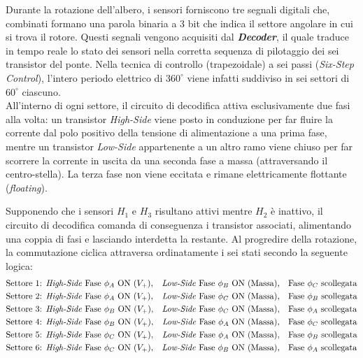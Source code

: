 ﻿\documentclass[11pt, a4paper]{article}
\begin{document}
Durante la rotazione dell'albero, i sensori forniscono tre segnali digitali che, combinati formano una parola binaria a 3 bit che indica il settore angolare in cui si trova il rotore. Questi segnali vengono acquisiti dal \textbf{\textit{Decoder}}, il quale traduce in tempo reale lo stato dei sensori nella corretta sequenza di pilotaggio dei sei transistor del ponte. Nella tecnica di controllo (trapezoidale) a sei passi (\textit{Six-Step Control}), l'intero periodo elettrico di $360^\circ$ viene infatti suddiviso in sei settori di $60^\circ$ ciascuno. \\
All'interno di ogni settore, il circuito di decodifica attiva esclusivamente due fasi alla volta: un transistor \textit{High-Side} viene posto in conduzione per far fluire la corrente dal polo positivo della tensione di alimentazione a una prima fase, mentre un transistor \textit{Low-Side} appartenente a un altro ramo viene chiuso per far scorrere la corrente in uscita da una seconda fase a massa (attraversando il centro-stella). La terza fase non viene eccitata e rimane elettricamente flottante (\textit{floating}).

Supponendo che i sensori $H_1$ e $H_3$ risultano attivi mentre $H_2$ è inattivo, il circuito di decodifica comanda di conseguenza i transistor associati, alimentando una coppia di fasi e lasciando interdetta la restante. Al progredire della rotazione, la commutazione ciclica attraversa ordinatamente i sei stati secondo la seguente logica:
\begin{align*}
    \text{Settore 1: } & \text{\textit{High-Side} Fase } \phi_A \text{ ON } (V_+), & \text{\textit{Low-Side} Fase } \phi_B \text{ ON (Massa)}, \quad & \text{Fase } \phi_C \text{ scollegata} \\
    \text{Settore 2: } & \text{\textit{High-Side} Fase } \phi_A \text{ ON } (V_+), & \text{\textit{Low-Side} Fase } \phi_C \text{ ON (Massa)}, \quad & \text{Fase } \phi_B \text{ scollegata} \\
    \text{Settore 3: } & \text{\textit{High-Side} Fase } \phi_B \text{ ON } (V_+), & \text{\textit{Low-Side} Fase } \phi_C \text{ ON (Massa)}, \quad & \text{Fase } \phi_A \text{ scollegata} \\
    \text{Settore 4: } & \text{\textit{High-Side} Fase } \phi_B \text{ ON } (V_+), & \text{\textit{Low-Side} Fase } \phi_A \text{ ON (Massa)}, \quad & \text{Fase } \phi_C \text{ scollegata} \\
    \text{Settore 5: } & \text{\textit{High-Side} Fase } \phi_C \text{ ON } (V_+), & \text{\textit{Low-Side} Fase } \phi_A \text{ ON (Massa)}, \quad & \text{Fase } \phi_B \text{ scollegata} \\
    \text{Settore 6: } & \text{\textit{High-Side} Fase } \phi_C \text{ ON } (V_+), & \text{\textit{Low-Side} Fase } \phi_B \text{ ON (Massa)}, \quad & \text{Fase } \phi_A \text{ scollegata}
\end{align*}
\end{document}
